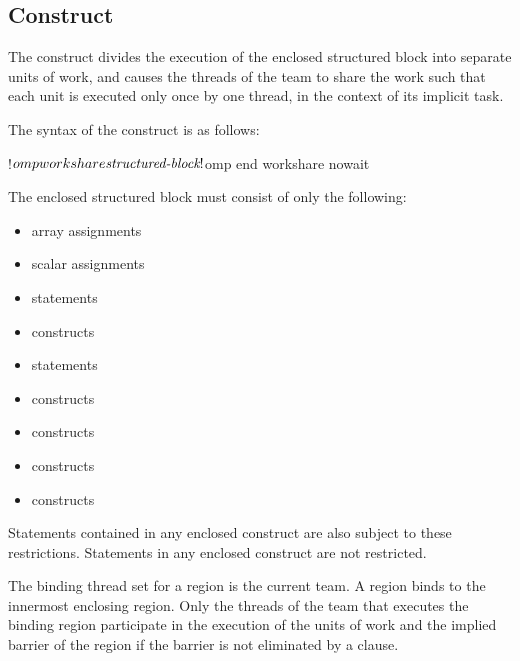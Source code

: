 \begin{fortranspecific}

\subsection{ Construct}
\label{subsec:workshare Construct}
\summary
The  construct divides the execution of the enclosed structured 
block into separate units of work, and causes the threads of the team to share 
the work such that each unit is executed only once by one thread, in the context 
of its implicit task.

\syntax
The syntax of the  construct is as follows:

\begin{ompfPragma}
!$omp workshare
    \plc{structured-block}
!$omp end workshare \plc{[}nowait\plc{]}
\end{ompfPragma}

The enclosed structured block must consist of only the following:

\begin{itemize}
\item array assignments

\item scalar assignments

\item {} statements

\item {} constructs

\item {} statements

\item {} constructs

\item {} constructs

\item {} constructs

\item {} constructs
\end{itemize}

Statements contained in any enclosed  construct are also subject 
to these restrictions. Statements in any enclosed  construct are 
not restricted.

\binding
The binding thread set for a  region is the current team. 
A  region binds to the innermost enclosing  
region. Only the threads of the team that executes the binding  
region participate in the execution of the units of work and the implied 
barrier of the  region if the barrier is not eliminated
by a  clause.


\end{fortranspecific}
